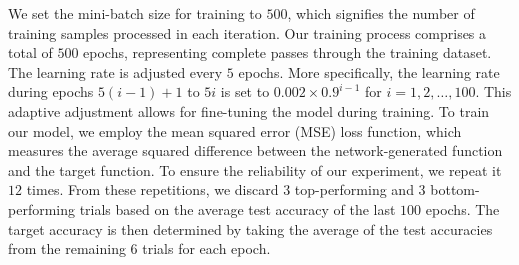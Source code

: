 \documentclass[nohyperref]{article}
\theoremstyle{plain}
\theoremstyle{definition}
\theoremstyle{remark}
\begin{document}
We set the mini-batch size for training to $500$, which signifies the number of training samples processed in each iteration. Our training process comprises a total of $500$ epochs, representing complete passes through the training dataset.
The learning rate is adjusted every $5$ epochs. More specifically, the learning rate during epochs $5(i-1)+1$ to $5i$ is set to $0.002\times 0.9^{i-1}$ for $i=1,2,\dotsc,100$. This adaptive adjustment allows for fine-tuning the model during training.
To train our model, we employ the mean squared error (MSE) loss function, which measures the average squared difference between the network-generated function and the target function.
To ensure the reliability of our experiment, we repeat it $12$ times. From these repetitions, we discard $3$ top-performing and $3$ bottom-performing trials based on the average test accuracy of the last $100$ epochs. The target accuracy is then determined by taking the average of the test accuracies from the remaining $6$ trials for each epoch.
\end{document}
